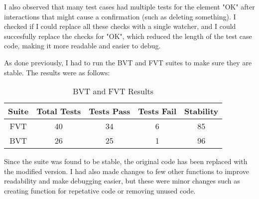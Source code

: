 I also observed that many test cases had multiple tests for the element "OK" after interactions that might cause a confirmation (such as deleting something). I checked if I could replace all these checks with a single watcher, and I could succesfully replace the checks for "OK", which reduced the length of the test case code, making it more readable and easier to debug.

As done previously, I had to run the BVT and FVT suites to make sure they are stable. The results were as follows:

\begin{table}[!h]
\centering
\caption{BVT and FVT Results}
\begin{tabular}{|c|c|c|c|c|}
\hline
Suite & Total Tests & Tests Pass & Tests Fail & Stability \\ \hline
FVT   & 40          & 34         & 6          & 85        \\ \hline
BVT   & 26          & 25         & 1          & 96       \\ \hline         
\end{tabular}
\end{table} 

Since the suite was found to be stable, the original code has been replaced with the modified version. I had also made changes to few other functions to improve readability and make debugging easier, but these were minor changes such as creating function for repetative code or removing unused code.